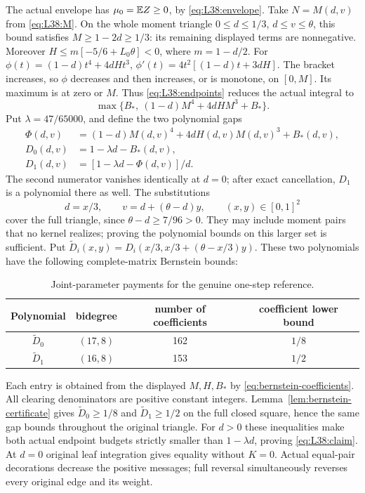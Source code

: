 The actual envelope has \(\mu_0=\mathbb E Z\ge0\), by
\eqref{eq:L38:envelope}. Take \(N=M(d,v)\) from \eqref{eq:L38:M}.
On the whole moment triangle \(0\le d\le1/3\), \(d\le v\le\theta\),
this bound satisfies \(M\ge1-2d\ge1/3\): its remaining displayed
terms are nonnegative. Moreover
\(H\le m[-5/6+L_0\theta]<0\), where \(m=1-d/2\).
For \(\phi(t)=(1-d)t^4+4dHt^3\),
\(\phi'(t)=4t^2[(1-d)t+3dH]\).
The bracket increases, so \(\phi\) decreases and then increases, or
is monotone, on \([0,M]\). Its maximum is at zero or \(M\).
Thus \eqref{eq:L38:endpoints} reduces the actual integral to
\[
 \max\{B_*,\ (1-d)M^4+4dHM^3+B_*\}.
\]
Put \(\lambda=47/65000\), and define the two polynomial gaps
\begin{equation}\label{eq:reference-synthesis:C038-gaps}
\begin{aligned}
 \Phi(d,v)&=(1-d)M(d,v)^4+4dH(d,v)M(d,v)^3+B_*(d,v),\\
 D_0(d,v)&=1-\lambda d-B_*(d,v),\\
 D_1(d,v)&=[1-\lambda d-\Phi(d,v)]/d.
\end{aligned}
\end{equation}
The second numerator vanishes identically at \(d=0\); after exact
cancellation, \(D_1\) is a polynomial there as well.
The substitutions
\[
 d=x/3,\qquad v=d+(\theta-d)y,\qquad (x,y)\in[0,1]^2
\]
cover the full triangle, since \(\theta-d\ge7/96>0\).
They may include moment pairs that no kernel realizes; proving the
polynomial bounds on this larger set is sufficient.
Put \(\widetilde D_i(x,y)=D_i(x/3,x/3+(\theta-x/3)y)\).
These two polynomials have the following complete-matrix Bernstein bounds:
\begin{table}[htbp]\centering\small
\caption{Joint-parameter payments for the genuine one-step reference.}
\label{tab:reference-synthesis:C038}
\begin{tabular}{@{}cccc@{}}
\toprule
Polynomial&bidegree&number of coefficients&coefficient lower bound\\
\midrule
\(\widetilde D_0\)&\((17,8)\)&162&\(1/8\)\\
\(\widetilde D_1\)&\((16,8)\)&153&\(1/2\)\\
\bottomrule
\end{tabular}
\end{table}
Each entry is obtained from the displayed \(M,H,B_*\) by
\eqref{eq:bernstein-coefficients}.
All clearing denominators are positive constant integers.
Lemma~\ref{lem:bernstein-certificate} gives \(\widetilde D_0\ge1/8\)
and \(\widetilde D_1\ge1/2\) on the full closed square, hence the
same gap bounds throughout the original triangle.
For \(d>0\) these inequalities make both actual endpoint budgets
strictly smaller than \(1-\lambda d\), proving \eqref{eq:L38:claim}.
At $d=0$ original leaf integration gives equality without $K=0$.
Actual equal-pair decorations decrease the positive messages; full
reversal simultaneously reverses every original edge and its weight.

